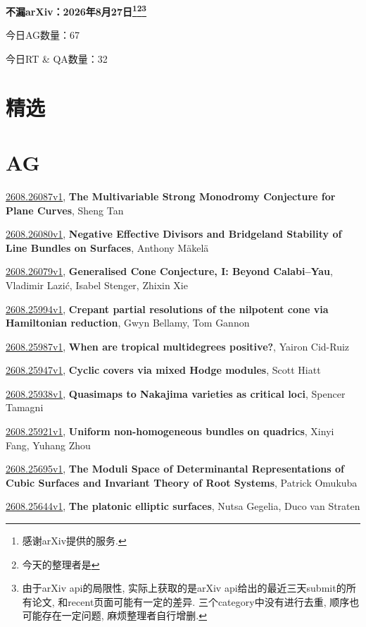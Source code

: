 \documentclass[9pt, a4paper]{article}
\theoremstyle{plain}
\theoremstyle{definition}
\theoremstyle{remark}
\newcommand{\arxiv}[3]{\href{https://arxiv.org/abs/#1}{#1}, \textbf{\textcolor{arxivblue}{#2}}, #3}
\newcommand{\AGnumber}{67}
\newcommand{\RTQAnumber}{32}
\newcommand{\NewestDate}{2026年8月27日}
\newcommand{\todayarXiver}{} %
\begin{document}
\begin{center}
    \Huge\textbf{不漏arXiv：\NewestDate\footnote{感谢arXiv提供的服务.}\footnote{今天的整理者是\todayarXiver}\footnote{由于arXiv api的局限性, 实际上获取的是arXiv api给出的最近三天submit的所有论文, 和recent页面可能有一定的差异. 三个category中没有进行去重, 顺序也可能存在一定问题, 麻烦整理者自行增删.}} \\
\end{center}

\setcounter{section}{-1}

\begin{center}
    今日AG数量：\AGnumber
    
    今日RT \& QA数量：\RTQAnumber
    
\end{center}


\section{精选}


\section{AG}
\arxiv{2608.26087v1}{The Multivariable Strong Monodromy Conjecture for Plane Curves}{Sheng Tan}

\arxiv{2608.26080v1}{Negative Effective Divisors and Bridgeland Stability of Line Bundles on Surfaces}{Anthony Mäkelä}

\arxiv{2608.26079v1}{Generalised Cone Conjecture, I: Beyond Calabi--Yau}{Vladimir Lazić, Isabel Stenger, Zhixin Xie}

\arxiv{2608.25994v1}{Crepant partial resolutions of the nilpotent cone via Hamiltonian reduction}{Gwyn Bellamy, Tom Gannon}

\arxiv{2608.25987v1}{When are tropical multidegrees positive?}{Yairon Cid-Ruiz}

\arxiv{2608.25947v1}{Cyclic covers via mixed Hodge modules}{Scott Hiatt}

\arxiv{2608.25938v1}{Quasimaps to Nakajima varieties as critical loci}{Spencer Tamagni}

\arxiv{2608.25921v1}{Uniform non-homogeneous bundles on quadrics}{Xinyi Fang, Yuhang Zhou}

\arxiv{2608.25695v1}{The Moduli Space of Determinantal Representations of Cubic Surfaces and Invariant Theory of Root Systems}{Patrick Omukuba}

\arxiv{2608.25644v1}{The platonic elliptic surfaces}{Nutsa Gegelia, Duco van Straten}
\end{document}
